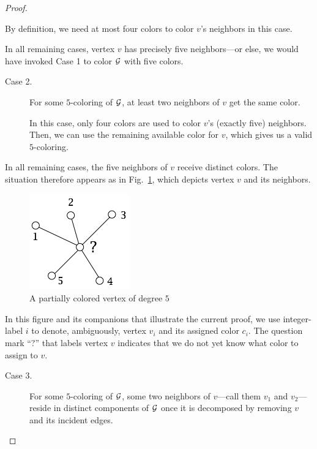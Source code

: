 \begin{proof}
\begin{description}
\smallskip

By definition, we need at most four colors to color $v$'s neighbors in this case.
\end{description}

In all remaining cases, vertex $v$ has precisely five neighbors---or else, we would have invoked Case 1 to color $\mbox{$\cal G$}$ with five colors.  


\begin{description}
\item[{\sf Case 2}.]
For some $5$-coloring of $\mbox{$\cal G$}$, at least two neighbors of $v$ get the same color.

\smallskip

In this case, only four colors are used to color $v$'s (exactly five) neighbors.  Then, we can use the remaining available color for $v$, which gives us a valid $5$-coloring.
\end{description}

\smallskip

In all remaining cases, the five neighbors of $v$ receive distinct colors.  The situation therefore appears as in Fig.~\ref{fig:5colorsInit}, which depicts vertex $v$ and its neighbors.
\begin{figure}[hbt]
\begin{center}
   \includegraphics[scale=0.38]{FiguresGraph/5colorsInit}
\caption{A partially colored vertex of degree $5$}
  \label{fig:5colorsInit}
\end{center}
\end{figure}
In this figure and its companions that illustrate the current proof, we use integer-label $i$ to denote, ambiguously, vertex $v_i$ and its assigned color $c_i$.  The question mark ``?'' that labels vertex $v$ indicates that we do not yet know what color to assign to $v$. 


\begin{description}
\item[{\sf Case 3}.]
For some $5$-coloring of $\mbox{$\cal G$}$, some two neighbors of $v$---call them $v_1$ and $v_2$---reside in distinct components of $\mbox{$\cal G$}$ once it is decomposed by removing $v$ and its incident edges.


\end{description}
\end{proof}
